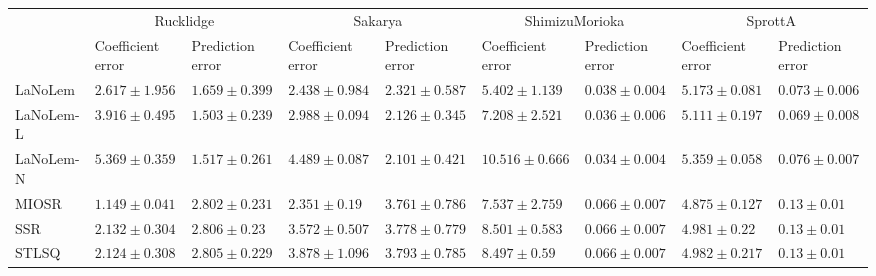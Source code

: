 \begin{table*}
{\begin{tabular}{lllllllll}
 & \multicolumn{2}{c}{Rucklidge} & \multicolumn{2}{c}{Sakarya} & \multicolumn{2}{c}{ShimizuMorioka} & \multicolumn{2}{c}{SprottA} \\
 & Coefficient error & Prediction error & Coefficient error & Prediction error & Coefficient error & Prediction error & Coefficient error & Prediction error \\
\midrule
LaNoLem & $2.617\pm 1.956$ & $1.659\pm 0.399$ & $2.438\pm 0.984$ & $2.321\pm 0.587$ & $\mathbf{5.402}\pm 1.139$ & $0.038\pm 0.004$ & $5.173\pm 0.081$ & $0.073\pm 0.006$ \\
LaNoLem-L & $3.916\pm 0.495$ & $\mathbf{1.503}\pm 0.239$ & $2.988\pm 0.094$ & $2.126\pm 0.345$ & $7.208\pm 2.521$ & $0.036\pm 0.006$ & $5.111\pm 0.197$ & $\mathbf{0.069}\pm 0.008$ \\
LaNoLem-N & $5.369\pm 0.359$ & $1.517\pm 0.261$ & $4.489\pm 0.087$ & $\mathbf{2.101}\pm 0.421$ & $10.516\pm 0.666$ & $\mathbf{0.034}\pm 0.004$ & $5.359\pm 0.058$ & $0.076\pm 0.007$ \\
MIOSR & $\mathbf{1.149}\pm 0.041$ & $2.802\pm 0.231$ & $\mathbf{2.351}\pm 0.19$ & $3.761\pm 0.786$ & $7.537\pm 2.759$ & $0.066\pm 0.007$ & $\mathbf{4.875}\pm 0.127$ & $0.13\pm 0.01$ \\
SSR & $2.132\pm 0.304$ & $2.806\pm 0.23$ & $3.572\pm 0.507$ & $3.778\pm 0.779$ & $8.501\pm 0.583$ & $0.066\pm 0.007$ & $4.981\pm 0.22$ & $0.13\pm 0.01$ \\
STLSQ & $2.124\pm 0.308$ & $2.805\pm 0.229$ & $3.878\pm 1.096$ & $3.793\pm 0.785$ & $8.497\pm 0.59$ & $0.066\pm 0.007$ & $4.982\pm 0.217$ & $0.13\pm 0.01$ \\

\midrule


\end{tabular}}
\end{table*}
